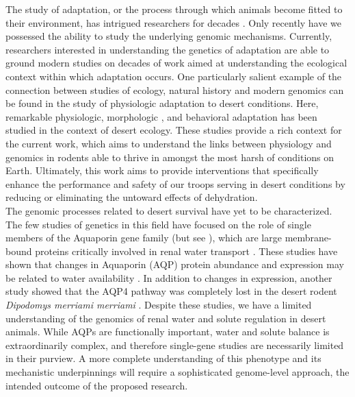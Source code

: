 \documentclass[12pt]{article}
\begin{document}
The study of adaptation, or the process through which animals become fitted to their environment, has intrigued researchers for decades \citep{Darwin:1859tm, Fisher:1930wy}. Only recently have we possessed the ability to study the underlying genomic mechanisms. Currently, researchers interested in understanding the genetics of adaptation are able to ground modern studies on decades of work aimed at understanding the ecological context within which adaptation occurs. One particularly salient example of the connection between studies of ecology, natural history and modern genomics can be found in the study of physiologic adaptation to desert conditions. Here, remarkable physiologic, morphologic \citep{Dickinson:2007jn,Huntley:1984us,SchmidtNielsen:1950wg,SchmidtNielsen:1952wp}, and behavioral \citep{NAGY:1994vd} adaptation has been studied in the context of desert ecology. These studies provide a rich context for the current work, which aims to understand the links between physiology and genomics in rodents able to thrive in amongst the most harsh of conditions on Earth. Ultimately, this work aims to provide interventions that specifically enhance the performance and safety of our troops serving in desert conditions by reducing or eliminating the untoward effects of dehydration.\\

The genomic processes related to desert survival have yet to be characterized. The few studies of genetics in this field have focused on the role of single members of the Aquaporin gene family (but see \citealt{Bartolo:2007hy}), which are large membrane-bound proteins critically involved in renal water transport \citep{Kwon:2009bv,Verkman:2002ww,Brown:1995vo,Nielsen:1995cb}. These studies have shown that changes in Aquaporin (AQP) protein abundance and expression may be related to water availability \citep{Boselt:2009fb, Gallardo:2005fm,Bozinovic:2003eg}. In addition to changes in expression, another study showed that the AQP4 pathway was completely lost in the desert rodent \textit{Dipodomys merriami merriami} \citep{Huang:2001ti}. Despite these studies, we have a limited understanding of the genomics of renal water and solute regulation in desert animals. While AQPs are functionally important, water and solute balance is extraordinarily complex, and therefore single-gene studies are necessarily limited in their purview. A more complete understanding of this phenotype and its mechanistic underpinnings will require a sophisticated genome-level approach,  the intended outcome of the proposed research. \\
\end{document}
